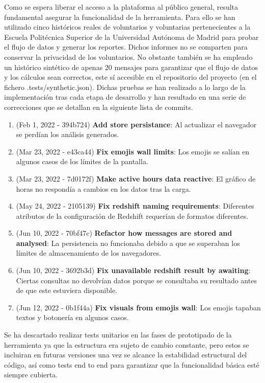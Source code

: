 
Como se espera liberar el acceso a la plataforma al público general, resulta fundamental asegurar la funcionalidad de la herramienta. Para ello se han utilizado cinco históricos reales de voluntarios y voluntarias pertenecientes a la Escuela Politécnica Superior de la Universidad Autónoma de Madrid para probar el flujo de datos y generar los reportes. Dichos informes no se comparten para conservar la privacidad de los voluntarios. No obstante también se ha empleado un histórico sintético de apenas 20 mensajes para garantizar que el flujo de datos y los cálculos sean correctos, este sí accesible en el repositorio del proyecto\cite{Repositorio} (en el fichero .tests/synthetic.json). Dichas pruebas se han realizado a lo largo de la implementación tras cada etapa de desarrollo y han resultado en una serie de correcciones que se detallan en la siguiente lista de commits.

\begin{enumerate}
    \item (Feb 1, 2022 - 394b724) \textbf{Add store persistance}: Al actualizar el navegador se perdían los análisis generados.
    \item (Mar 23, 2022 - e43ca44) \textbf{Fix emojis wall limits}: Los emojis se salían en algunos casos de los límites de la pantalla. 
    \item (Mar 23, 2022 - 7d0172f) \textbf{Make active hours data reactive}: El gráfico de horas no respondía a cambios en los datos tras la carga. 
    \item (May 24, 2022 - 2105139) \textbf{Fix redshift naming requirements}: Diferentes atributos de la configuración de Redshift requerían de formatos diferentes.
    \item (Jun 10, 2022 - 70bf47c) \textbf{Refactor how messages are stored and analysed}: La persistencia no funcionaba debido a que se superaban los límites de almacenamiento de los navegadores.
    \item (Jun 10, 2022 - 3692b3d) \textbf{Fix unavailable redshift result by awaiting}: Ciertas consultas no devolvían datos porque se consultaba su resultado antes de que este estuviera disponible.
    \item (Jun 12, 2022 - 0b1f44a) \textbf{Fix visuals from emojis wall}: Los emojis tapaban textos y botonería en algunos casos.
\end{enumerate}

Se ha descartado realizar tests unitarios en las fases de prototipado de la herramienta ya que la estructura era sujeto de cambio constante, pero estos se incluiran en futuras versiones una vez se alcance la estabilidad estructural del código, así como tests end to end para garantizar que la funcionalidad básica esté siempre cubierta.

